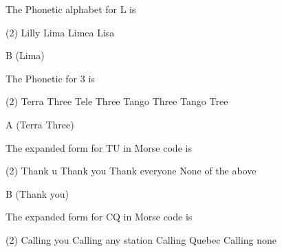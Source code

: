 \documentclass[a4paper]{article}
\begin{document}
\vspace{5mm}



\begin{question}The Phonetic alphabet for \apostrophe{}L\apostrophe{} is
	\begin{tasks}(2)
		\task Lilly
		\task Lima
		\task Limca
		\task Lisa
	\end{tasks}
\end{question}

\begin{solution}
	B (Lima)
\end{solution}

\vspace{5mm}



\begin{question}The Phonetic for \apostrophe{}3\apostrophe{} is
	\begin{tasks}(2)
		\task Terra Three
		\task Tele Three
		\task Tango Three
		\task Tango Tree
	\end{tasks}
\end{question}

\begin{solution}
	A (Terra Three\textsl{})
\end{solution}

\vspace{5mm}



\begin{question}The expanded form for \apostrophe{}TU\apostrophe{} in Morse code is
	\begin{tasks}(2)
		\task Thank u
		\task Thank you
		\task Thank everyone
		\task None of the above
	\end{tasks}
\end{question}

\begin{solution}
	B (Thank you)
\end{solution}

\vspace{5mm}



\begin{question}The expanded form for \apostrophe{}CQ\apostrophe{} in Morse code is
	\begin{tasks}(2)
		\task Calling you
		\task Calling any station
		\task Calling Quebec
		\task Calling none
	\end{tasks}
\end{question}
\end{document}
